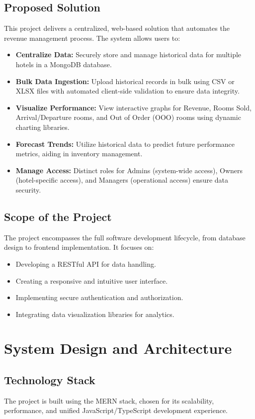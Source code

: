 \documentclass[letterpaper,11pt]{report}
\begin{document}
\section{Proposed Solution}
This project delivers a centralized, web-based solution that automates the revenue management process. The system allows users to:
\begin{itemize}
    \item \textbf{Centralize Data:} Securely store and manage historical data for multiple hotels in a MongoDB database.
    \item \textbf{Bulk Data Ingestion:} Upload historical records in bulk using CSV or XLSX files with automated client-side validation to ensure data integrity.
    \item \textbf{Visualize Performance:} View interactive graphs for Revenue, Rooms Sold, Arrival/Departure rooms, and Out of Order (OOO) rooms using dynamic charting libraries.
    \item \textbf{Forecast Trends:} Utilize historical data to predict future performance metrics, aiding in inventory management.
    \item \textbf{Manage Access:} Distinct roles for Admins (system-wide access), Owners (hotel-specific access), and Managers (operational access) ensure data security.
\end{itemize}

\section{Scope of the Project}
The project encompasses the full software development lifecycle, from database design to frontend implementation. It focuses on:
\begin{itemize}
    \item Developing a RESTful API for data handling.
    \item Creating a responsive and intuitive user interface.
    \item Implementing secure authentication and authorization.
    \item Integrating data visualization libraries for analytics.
\end{itemize}

\chapter{System Design and Architecture}

\section{Technology Stack}
The project is built using the MERN stack, chosen for its scalability, performance, and unified JavaScript/TypeScript development experience.
\end{document}
